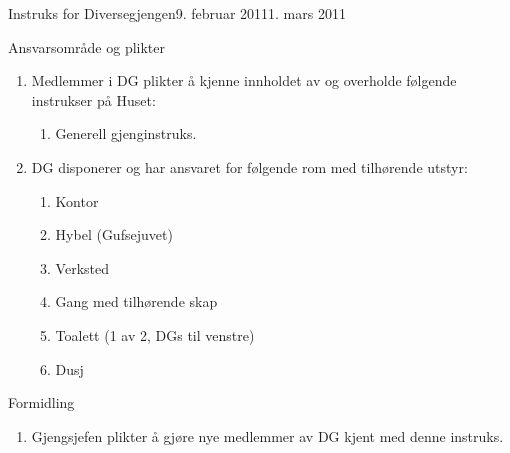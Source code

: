 \begin{instruks}{Instruks for Diversegjengen}{9. februar 2011}{1. mars 2011}
    \begin{instruksledd}{Ansvarsområde og plikter}
        \begin{enumerate}   
            \item  Medlemmer i DG plikter å kjenne innholdet av og overholde følgende instrukser på Huset:
                \begin{enumerate}
                    \item Generell gjenginstruks.
                \end{enumerate}
            \item DG disponerer og har ansvaret for følgende rom med tilhørende utstyr:
                \begin{enumerate}
                    \item Kontor
                    \item Hybel (Gufsejuvet)
                    \item Verksted
                    \item Gang med tilhørende skap
                    \item Toalett (1 av 2, DGs til venstre)
                    \item  Dusj
                \end{enumerate}
        \end{enumerate}
    \end{instruksledd}

    \begin{instruksledd}{Formidling}
        \begin{enumerate}
            \item Gjengsjefen plikter å gjøre nye medlemmer av DG kjent med denne instruks.
        \end{enumerate}
    \end{instruksledd}


\end{instruks}


